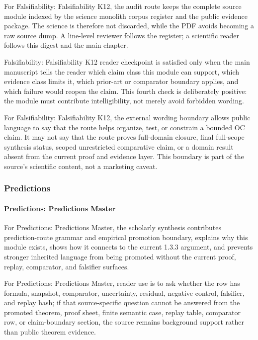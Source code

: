 For Falsifiability: Falsifiability K12, the audit route keeps the complete source module indexed by the science monolith corpus register and the public evidence package. The science is therefore not discarded, while the PDF avoids becoming a raw source dump. A line-level reviewer follows the register; a scientific reader follows this digest and the main chapter.


Falsifiability: Falsifiability K12 reader checkpoint is satisfied only when the main manuscript tells the reader which claim class this module can support, which evidence class limits it, which prior-art or comparator boundary applies, and which failure would reopen the claim. This fourth check is deliberately positive: the module must contribute intelligibility, not merely avoid forbidden wording.


For Falsifiability: Falsifiability K12, the external wording boundary allows public language to say that the route helps organize, test, or constrain a bounded OC claim. It may not say that the route proves full-domain closure, final full-scope synthesis status, scoped unrestricted comparative claim, or a domain result absent from the current proof and evidence layer. This boundary is part of the source's scientific content, not a marketing caveat.


\subsubsection{Predictions}

\paragraph{Predictions: Predictions Master}

For Predictions: Predictions Master, the scholarly synthesis contributes prediction-route grammar and empirical promotion boundary, explains why this module exists, shows how it connects to the current 1.3.3 argument, and prevents stronger inherited language from being promoted without the current proof, replay, comparator, and falsifier surfaces.


For Predictions: Predictions Master, reader use is to ask whether the row has formula, snapshot, comparator, uncertainty, residual, negative control, falsifier, and replay hash; if that source-specific question cannot be answered from the promoted theorem, proof sheet, finite semantic case, replay table, comparator row, or claim-boundary section, the source remains background support rather than public theorem evidence.


